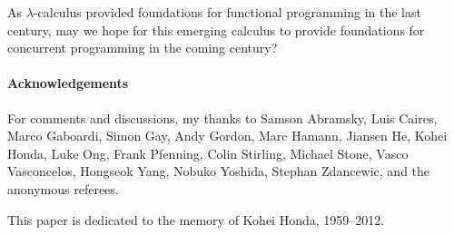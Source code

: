 \documentclass{jfp1}
\begin{document}
As $\lambda$-calculus provided foundations for functional
programming in the last century, may we hope for this emerging
calculus to provide foundations for concurrent programming in the
coming century?


\paragraph*{Acknowledgements}
For comments and discussions, my thanks to
Samson Abramsky,
Luis Caires,
Marco Gaboardi,
Simon Gay,
Andy Gordon,
Marc Hamann,
Jiansen He,
Kohei Honda,
Luke Ong,
Frank Pfenning,
Colin Stirling,
Michael Stone,
Vasco Vasconcelos,
Hongseok Yang,
Nobuko Yoshida,
Stephan Zdancewic,
and the anonymous referees.

This paper is dedicated to the memory of Kohei Honda, 1959--2012.

\paragraph{}



\end{document}

